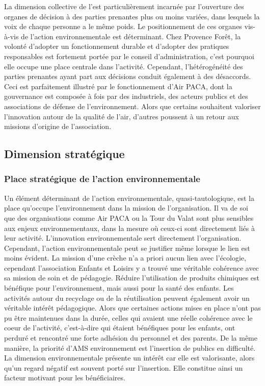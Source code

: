         La dimension collective de l'\ess est particulièrement incarnée par l'ouverture des organes de décision à des parties prenantes plus ou moins variées, dans lesquels la voix de chaque personne a le même poids. Le positionnement de ces organes vis-à-vis de l'action environnementale est déterminant. Chez Provence Forêt, la volonté d'adopter un fonctionnement durable et d'adopter des pratiques responsables est fortement portée par le conseil d'administration, c'est pourquoi elle occupe une place centrale dans l'activité. Cependant, l'hétérogénéité des parties prenantes ayant part aux décisions conduit également à des désaccords. Ceci est parfaitement illustré par le fonctionnement d'Air PACA, dont la gouvernance est composée à fois par des industriels, des acteurs publics et des associations de défense de l'environnement. Alors que certains souhaitent valoriser l'innovation autour de la qualité de l'air, d'autres poussent à un retour aux missions d'origine de l'association.

    \subsection{Dimension stratégique}
        \subsubsection{Place stratégique de l'action environnementale}
        Un élément déterminant de l'action environnementale, quasi-tautologique, est la place qu'occupe l'environnement dans la mission de l'organisation. Il va de soi que des organisations comme Air PACA ou la Tour du Valat sont plus sensibles aux enjeux environnementaux, dans la mesure où ceux-ci sont directement liés à leur activité. L'innovation environnementale sert directement l'organisation.
        Cependant, l'action environnementale peut se justifier même lorsque le lien est moins évident. La mission d'une crèche n'a a priori aucun lien avec l'écologie, cependant l'association Enfants et Loisirs y a trouvé une véritable cohérence avec sa mission de soin et de pédagogie. Réduire l'utilisation de produits chimiques est bénéfique pour l'environnement, mais aussi pour la santé des enfants. Les activités autour du recyclage ou de la réutilisation peuvent également avoir un véritable intérêt pédagogique. Alors que certaines actions mises en place n'ont pas pu être maintenues dans la durée, celles qui avaient une réelle cohérence avec le coeur de l'activité, c'est-à-dire qui étaient bénéfiques pour les enfants, ont perduré et rencontré une forte adhésion du personnel et des parents. De la même manière, la priorité d'AMS environnement est l'insertion de publics en difficulté. La dimension environnementale présente un intérêt car elle est valorisante, alors qu'un regard négatif est souvent porté sur l'insertion. Elle constitue ainsi un facteur motivant pour les bénéficiaires.

